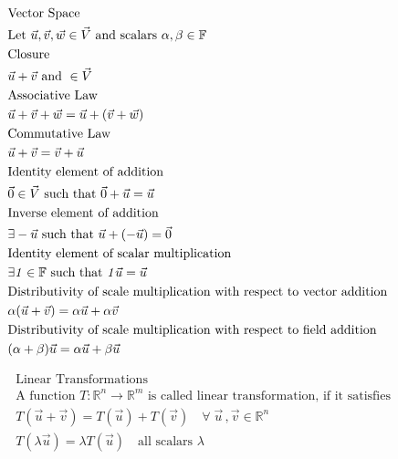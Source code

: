 \documentclass[10pt]{article}
\begin{document}
\pagebreak
\begin{align*}
    & \mbox{Vector Space} \\
    & \noindent \text{Let }\vec{u}, \vec{v}, \vec{w} \in \vec{V} \text{ and scalars } \alpha, \beta \in \mathbb{F} \\
    & \mbox{Closure} \\ 
    & \vec{u} + \vec{v} \text{ and } \in \vec{V} \\
    & \mbox{Associative Law} \\
    & \vec{u} + \vec{v} + \vec{w} = \vec{u} + (\vec{v} + \vec{w}) \\
    & \mbox{Commutative Law} \\
    & \vec{u} + \vec{v} = \vec{v} + \vec{u}  \\
    & \mbox{Identity element of addition}\\
    & \vec{0} \in \vec{V} \text{ such that } \vec{0} + \vec{u} = \vec{u}\\
    & \mbox{Inverse element of addition}\\
    & \exists -\vec{u} \text{ such that } \vec{u} + (-\vec{u}) = \vec{0}\\
    & \mbox{Identity element of scalar multiplication}\\
    & \exists \mathit{1} \in \mathbb{F} \text{ such that } \mathit{1}\vec{u} = \vec{u}\\
    & \mbox{Distributivity of scale multiplication with respect to vector addition}\\
    & \alpha(\vec{u} + \vec{v}) = \alpha\vec{u} + \alpha\vec{v}\\
    & \mbox{Distributivity of scale multiplication with respect to field addition}\\
    & (\alpha + \beta)\vec{u} = \alpha\vec{u} + \beta\vec{u}\\
\end{align*}

\pagebreak
\begin{align*}
    & \mbox{Linear Transformations} \\
    & \mbox{A function } \mathit{T}: \mathbb{R}^n \rightarrow \mathbb{R}^m \mbox{ is called linear transformation, if it satisfies} \\
    & \mathit{T} ( \vec{u} + \vec{v} ) = \mathit{T}(\vec{u}) + \mathit{T}(\vec{v}) \quad \forall \; \vec{u} \,, \vec{v} \in \mathbb{R}^n\\
    & \mathit{T} ( \lambda \vec{u} ) = \lambda \mathit{T}(\vec{u}) \quad \mbox{all scalars } \lambda \\
\end{align*}
\end{document}

